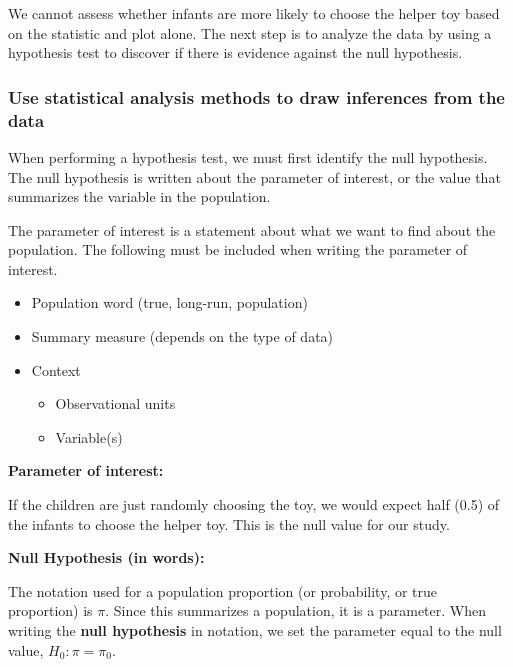 \documentclass[
]{report}
\begin{document}
\vspace{0.5in}

We cannot assess whether infants are more likely to choose the helper toy based on the statistic and plot alone. The next step is to analyze the data by using a hypothesis test to discover if there is evidence against the null hypothesis.

\subsubsection*{Use statistical analysis methods to draw inferences from the data}\label{use-statistical-analysis-methods-to-draw-inferences-from-the-data}

When performing a hypothesis test, we must first identify the null hypothesis. The null hypothesis is written about the parameter of interest, or the value that summarizes the variable in the population.

The parameter of interest is a statement about what we want to find about the population. The following must be included when writing the parameter of interest.

\begin{itemize}
\item
  Population word (true, long-run, population)
\item
  Summary measure (depends on the type of data)
\item
  Context

  \begin{itemize}
  \item
    Observational units
  \item
    Variable(s)
  \end{itemize}
\end{itemize}

\textbf{Parameter of interest:}

\vspace{0.5in}

If the children are just randomly choosing the toy, we would expect half (0.5) of the infants to choose the helper toy. This is the null value for our study.

\textbf{Null Hypothesis (in words):}

\vspace{0.5in}

The notation used for a population proportion (or probability, or true proportion) is \(\pi\). Since this summarizes a population, it is a parameter. When writing the \textbf{null hypothesis} in notation, we set the parameter equal to the null value, \(H_0: \pi = \pi_0\).
\end{document}
